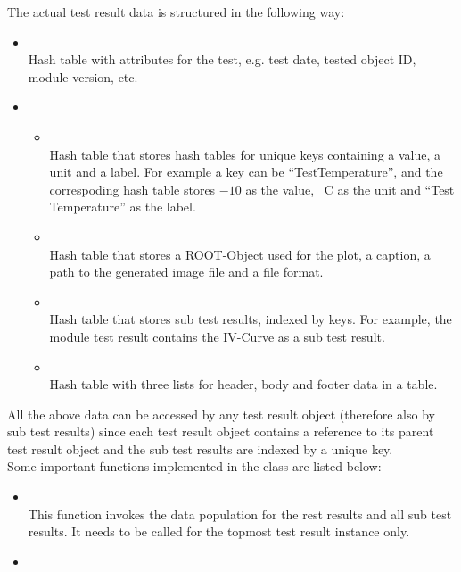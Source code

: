 \documentclass[0_Bericht]{subfiles}
\begin{document}
\begin{itemize}
						The actual test result data is structured in the following way:
						\begin{itemize}
							\item {} \\
								Hash table with attributes for the test, e.g. test date, tested object ID, module version, etc.
								
							\item {} \\
								\begin{itemize}
									\item {} \\
										Hash table that stores hash tables for unique keys containing a value, a unit and a label.
										For example a key can be ``TestTemperature'', and the correspoding hash table stores $-10$ as the value, \unit{\circ C} as the unit and ``Test Temperature'' as the label.
									\item {} \\
										Hash table that stores a ROOT-Object used for the plot, a caption, a path to the generated image file and a file format.
									\item {} \\
										Hash table that stores sub test results, indexed by keys. For example, the module test result contains the IV-Curve as a sub test result.
									\item {} \\
										Hash table with three lists for header, body and footer data in a table.
								\end{itemize}
						\end{itemize}
						All the above data can be accessed by any test result object (therefore also by sub test results) since each test result object contains a reference to its parent test result object and the sub test results are indexed by a unique key. \\
						Some important functions implemented in the class are listed below:
						\begin{itemize}
							\item {} \\
								This function invokes the data population for the rest results and all sub test results. It needs to be called for the topmost test result instance only.
							\item {} \\

\end{itemize}
\end{itemize}
\end{document}
